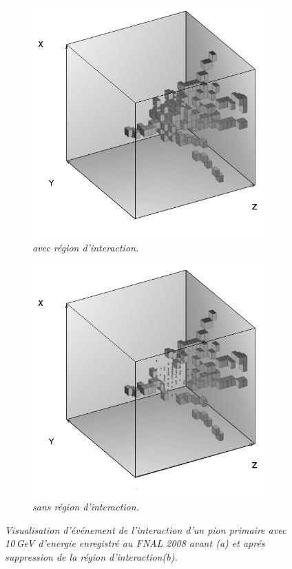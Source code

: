 \begin{figure}
	\centering
	\begin{subfigure}{0.5\textwidth}
		\centering
		\includegraphics[width=.90\linewidth]{ECAL/graphics/before.png}
		\caption{\label{fig:beforeF} \sl avec région d'interaction.}
	\end{subfigure}%
	\begin{subfigure}{0.5\textwidth}
		\centering
		\includegraphics[width=.90\linewidth]{ECAL/graphics/after2.png}
		\caption{\label{fig:afterF} \sl sans région d'interaction.}
	\end{subfigure}
	\caption{ \sl Visualisation d'événement de l'interaction d'un pion primaire avec 10\,GeV d'energie enregistré au FNAL 2008 avant \textit{(a)} et apr\'es suppression de la région d'interaction\textit{(b)}. }
	\label{fig:testF}
\end{figure}


